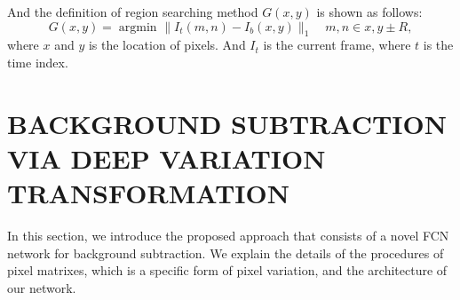 \documentclass[runningheads,a4paper]{llncs}
\DeclareMathOperator*{\argmin}{argmin}
\begin{document}


And the definition of region searching method $G(x,y)$ is shown as follows:
\begin{equation}
    G(x,y) =  \mathop{\argmin}_{}{ \lVert I_t(m,n) - I_b(x,y) \rVert_{1}  } \quad  m,n \in x,y \pm R,
\end{equation}
where $x$ and $y$ is the location of pixels. And $I_t$ is the current frame, where $t$ is the
time index.

\section{BACKGROUND SUBTRACTION VIA DEEP VARIATION TRANSFORMATION}
In this section, we introduce the proposed approach that consists of a novel FCN network for background subtraction. We explain the details of the procedures of pixel matrixes, which is a specific form of pixel variation, and the architecture of our network. 
\end{document}
